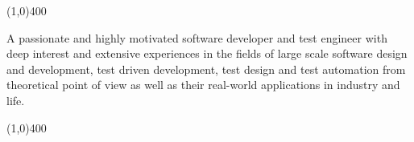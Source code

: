 \documentclass{resume}
\author{Amin Khorsandi}
\begin{document}
\maketitle

\begin{center}
\line(1,0){400}
\end{center}

\par \begin{flushleft}A passionate and highly motivated software developer 
and test engineer with deep interest and extensive experiences in the 
fields of large scale software design and development, test driven 
development, test design and test automation from theoretical point 
of view as well as their real-world applications in industry and life.
\end{flushleft}

\begin{center}
\line(1,0){400}
\end{center}
\end{document}
